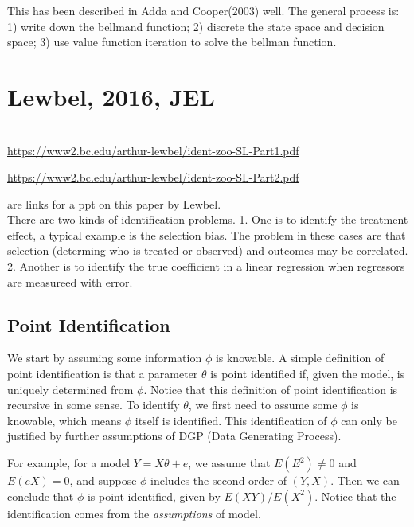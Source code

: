 \documentclass{book}
\theoremstyle{plain}
\theoremstyle{definition}
\begin{document}
This has been described in Adda and Cooper(2003) well. 
The general process is: 
1) write down the bellmand function;
2) discrete the state space and decision space;
3) use value function iteration to solve the bellman function.




\section{Lewbel, 2016, JEL} %
\label{sec:lewbel_2016_jel}

\textbf{}\\

\url{https://www2.bc.edu/arthur-lewbel/ident-zoo-SL-Part1.pdf} 

\url{https://www2.bc.edu/arthur-lewbel/ident-zoo-SL-Part2.pdf}

are links for a ppt on this paper by Lewbel.\\

There are two kinds of identification problems. 
1. One is to identify the treatment effect, a typical example is the selection bias. The problem in these cases are that selection (determing who is treated or observed) and outcomes may be correlated. 
2. Another is to identify the true coefficient in a linear regression when regressors are measureed with error.

\subsection{Point Identification} %
\label{sub:point_identification}

We start by assuming some information $\phi$ is knowable. A simple definition of point identification is that a parameter $\theta$ is point identified if, given the model, is uniquely determined from $\phi$. Notice that this definition of point identification is recursive in some sense. To identify $\theta$, we first need to assume some $\phi$ is knowable, which means $\phi$ itself is identified. This identification of $\phi$ can only be justified by further assumptions of DGP (Data Generating Process).

For example, for a model $Y = X\theta +e$, we assume that $E(E^2)\ne0$ and $E(eX)=0$, and suppose $\phi$ includes the second order of $(Y,X)$. Then we can conclude that $\phi$ is point identified, given by $E(XY)/E(X^2)$. Notice that the identification comes from the \textit{assumptions} of model.
\end{document}
